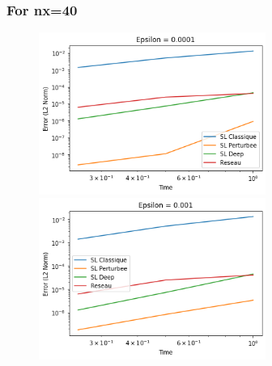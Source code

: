 \documentclass{article}
\begin{document}
\subsubsection*{For nx=40}

\begin{figure}[!h]
    \centering
    \includegraphics[width=0.66\textwidth]{images/ep11.png}
    \includegraphics[width=0.66\textwidth]{images/ep12.png}
\end{figure}
\end{document}
